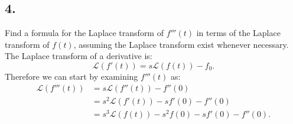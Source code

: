\subsection*{4.} Find a formula for the Laplace transform of $f'''(t)$ in terms of the Laplace transform of $f(t)$, assuming the Laplace transform exist whenever necessary.
\bigbreak
The Laplace transform of a derivative is:
\[ 
\mathcal{L}\left( f'(t) \right) = s \mathcal{L}\left( f(t) \right) - f_0
.\]
Therefore we can start by examining $f'''(t)$ as:
\begin{align*}
  \mathcal{L}\left( f'''(t) \right) &= s \mathcal{L}\left( f''(t) \right) - f''(0) \\
  &= s^2 \mathcal{L}\left( f'(t) \right) - sf'(0)- f''(0) \\
  &= s^3 \mathcal{L}(f(t)) - s^2 f(0) - s f'(0) - f''(0)
.\end{align*}




